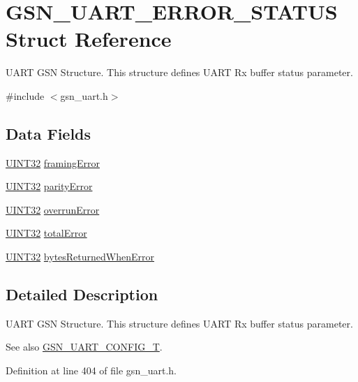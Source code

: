 \hypertarget{a00265}{
\section{GSN\_\-UART\_\-ERROR\_\-STATUS Struct Reference}
\label{a00265}
}


UART GSN Structure. This structure defines UART Rx buffer status parameter.  




{\ttfamily \#include $<$gsn\_\-uart.h$>$}

\subsection*{Data Fields}
\begin{DoxyCompactItemize}
\item 
\hyperlink{a00660_gae1e6edbbc26d6fbc71a90190d0266018}{UINT32} \hyperlink{a00265_aad94c1c211b8f498204a9ffdca364420}{framingError}
\item 
\hyperlink{a00660_gae1e6edbbc26d6fbc71a90190d0266018}{UINT32} \hyperlink{a00265_af0e678430ecd0ed08f8565f933e4f8ec}{parityError}
\item 
\hyperlink{a00660_gae1e6edbbc26d6fbc71a90190d0266018}{UINT32} \hyperlink{a00265_a900e4b98751491ead7c6496de3a834e4}{overrunError}
\item 
\hyperlink{a00660_gae1e6edbbc26d6fbc71a90190d0266018}{UINT32} \hyperlink{a00265_a02af367c24288030c3d38a1c4c9fb09a}{totalError}
\item 
\hyperlink{a00660_gae1e6edbbc26d6fbc71a90190d0266018}{UINT32} \hyperlink{a00265_acd186c4271e7113e326b7f09f0a1d6fd}{bytesReturnedWhenError}
\end{DoxyCompactItemize}


\subsection{Detailed Description}
UART GSN Structure. This structure defines UART Rx buffer status parameter. 

\begin{DoxySeeAlso}{See also}
\hyperlink{a00656_gab793201a4cc37e8cf27b0b640b1f37bc}{GSN\_\-UART\_\-CONFIG\_\-T}. 
\end{DoxySeeAlso}


Definition at line 404 of file gsn\_\-uart.h.



